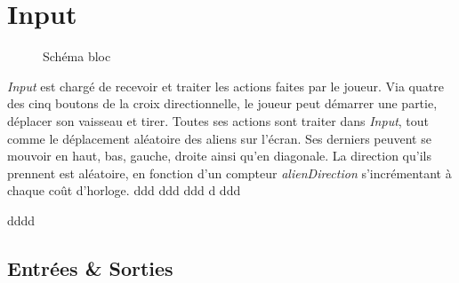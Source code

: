 \documentclass[french]{nakrule}
\begin{document}
\clearpage

\section{Input}
\label{sec:input}


\begin{figure}
\caption{Schéma bloc}
\label{inputBloc}
\end{figure}

\emph{Input} est chargé de recevoir et traiter les actions faites par le joueur.
Via quatre des cinq boutons de la croix directionnelle, le joueur peut démarrer
une partie, déplacer son vaisseau et tirer. Toutes ses actions sont traiter dans
\emph{Input}, tout comme le déplacement aléatoire des aliens sur l'écran. Ses
derniers peuvent se mouvoir en haut, bas, gauche, droite ainsi qu'en diagonale.
La direction qu'ils prennent est aléatoire, en fonction d'un compteur
\emph{alienDirection} s'incrémentant à chaque coût d'horloge.
ddd
ddd
ddd
d
ddd


dddd

\vspace{.1in}



\subsection{Entrées \& Sorties}
\label{subsec:Entrées_Sorties_input}
\end{document}
